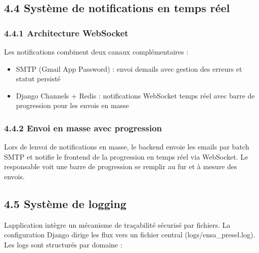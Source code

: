 \documentclass[
]{article}
\begin{document}
\hypertarget{systuxe8me-de-notifications-en-temps-ruxe9el}{%
\subsection{4.4 Système de notifications en temps
réel}\label{systuxe8me-de-notifications-en-temps-ruxe9el}}

\hypertarget{architecture-websocket}{%
\subsubsection{4.4.1 Architecture
WebSocket}\label{architecture-websocket}}

Les notifications combinent deux canaux complémentaires :

\begin{itemize}
\item
  SMTP (Gmail App Password) : envoi d\textquotesingle emails avec
  gestion des erreurs et statut persisté
\item
  Django Channels + Redis : notifications WebSocket temps réel avec
  barre de progression pour les envois en masse
\end{itemize}

\hypertarget{envoi-en-masse-avec-progression}{%
\subsubsection{4.4.2 Envoi en masse avec
progression}\label{envoi-en-masse-avec-progression}}

Lors de l\textquotesingle envoi de notifications en masse, le backend
envoie les emails par batch SMTP et notifie le frontend de la
progression en temps réel via WebSocket. Le responsable voit une barre
de progression se remplir au fur et à mesure des envois.

\hypertarget{systuxe8me-de-logging}{%
\subsection{4.5 Système de logging}\label{systuxe8me-de-logging}}

L\textquotesingle application intègre un mécanisme de traçabilité
sécurisé par fichiers. La configuration Django dirige les flux vers un
fichier central (logs/ensa\_presel.log). Les logs sont structurés par
domaine :
\end{document}
